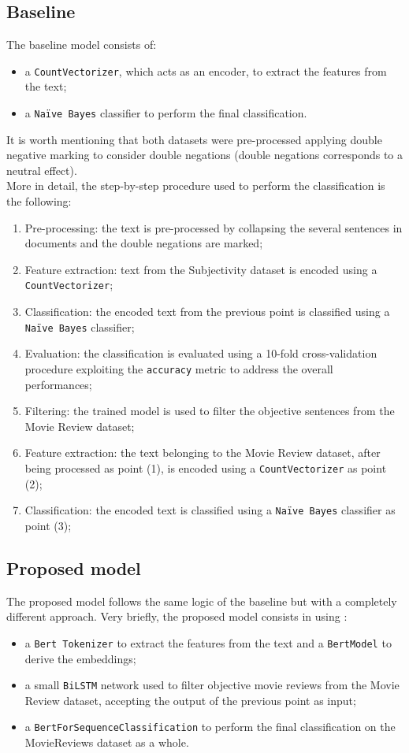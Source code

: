 \subsection{Baseline}
The baseline model consists of:
\begin{itemize}
    \item a \texttt{CountVectorizer}\cite{vectorizer}, which acts as an encoder, to extract the features from the text;
    \item a \texttt{Na\"{i}ve Bayes}\cite{naive} classifier to perform the final classification.
\end{itemize}
It is worth mentioning that both datasets were pre-processed applying double negative marking to consider double negations (double negations corresponds to a neutral effect).\\
More in detail, the step-by-step procedure used to perform the classification is the following:
\begin{enumerate}
    \item Pre-processing: the text is pre-processed by collapsing the several sentences in documents and the double negations are marked;
    \item Feature extraction: text from the Subjectivity dataset is encoded using a \texttt{CountVectorizer};
    \item Classification: the encoded text from the previous point is classified using a \texttt{Na\"{i}ve Bayes} classifier;
    \item Evaluation: the classification is evaluated using a 10-fold cross-validation procedure exploiting the \texttt{accuracy} metric to address the overall performances;
    \item Filtering: the trained model is used to filter the objective sentences from the Movie Review dataset;    
    \item Feature extraction: the text belonging to the Movie Review dataset, after being processed as point (1), is encoded using a \texttt{CountVectorizer} as point (2);
    \item Classification: the encoded text is classified using a \texttt{Na\"{i}ve Bayes} classifier as point (3);
\end{enumerate}
\vspace{-1.0em}
\subsection{Proposed model}
The proposed model follows the same logic of the baseline but with a completely different approach.
Very briefly, the proposed model consists in using :
\begin{itemize}
    \item a \texttt{Bert Tokenizer} \cite{tokenizer} to extract the features from the text and a \texttt{BertModel} \cite{model} to derive the embeddings;
    \item a small \texttt{BiLSTM} network used to filter objective movie reviews from the Movie Review dataset, accepting the output of the previous point as input;
    \item a \texttt{BertForSequenceClassification} to perform the final classification on the MovieReviews dataset as a whole.
\end{itemize}


